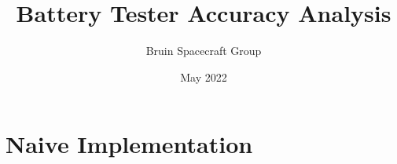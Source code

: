 \documentclass{article}
\title{Battery Tester Accuracy Analysis}
\author{Bruin Spacecraft Group}
\date{May 2022}
\begin{document}
\maketitle
\section{Naive Implementation}
\end{document}
